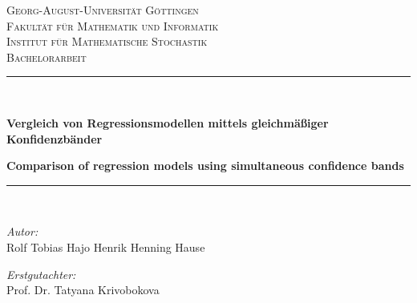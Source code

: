 \documentclass[12pt,a4paper]{article}
\theoremstyle{definition}
\theoremstyle{definition}
\theoremstyle{definition}
\begin{document}
\begin{titlepage}

\begin{center}



\textsc{\LARGE Georg-August-Universität Göttingen}\\
\textsc{Fakultät für Mathematik und Informatik}\\
\textsc{Institut für Mathematische Stochastik}\\[1.5cm]


\textsc{\Large Bachelorarbeit}\\[0.5cm]


\newcommand{\HRule}{\rule{\linewidth}{0.5mm}}
\HRule \\[0.4cm]
\begin{onehalfspace}
{ \LARGE \bfseries  Vergleich von Regressionsmodellen mittels gleichmäßiger Konfidenzbänder  }\\[0.4cm]
\end{onehalfspace}
{ \large \bfseries Comparison of regression models using simultaneous confidence bands}\\[0.4cm]

\HRule \\[1cm]


\begin{minipage}{0.4\textwidth}
\begin{flushleft} \large
\emph{Autor:}\\
Rolf Tobias Hajo Henrik Henning Hause\\
\end{flushleft}
\end{minipage}
\hfill
\begin{minipage}{0.4\textwidth}
\begin{flushright} \large
\emph{Erstgutachter:} \\
Prof. Dr. Tatyana Krivobokova\\
\end{flushright}
\end{minipage}
\vspace{0.3cm}


\end{center}
\end{titlepage}
\end{document}
